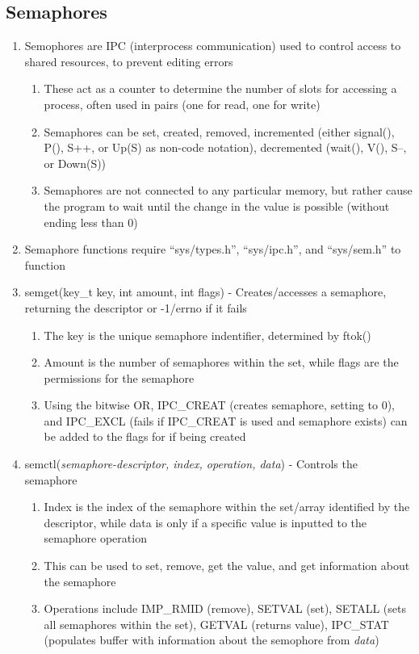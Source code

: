 \documentclass[11 pt, twoside]{article}
\begin{document}
\subsection{Semaphores}
\begin{enumerate}
\item Semophores are IPC (interprocess communication) used to control access to shared resources, to prevent editing errors
\begin{enumerate}
\item These act as a counter to determine the number of slots for accessing a process, often used in pairs (one for read, one for write)
\item Semaphores can be set, created, removed, incremented (either signal(), P(), S++, or Up(S) as non-code notation), decremented (wait(), V(), S--, or Down(S))
\item Semaphores are not connected to any particular memory, but rather cause the program to wait until the change in the value is possible (without ending less than 0)
\end{enumerate}
\item Semaphore functions require ``sys/types.h'', ``sys/ipc.h'', and ``sys/sem.h'' to function
\item semget(key\_t key, int amount, int flags) - Creates/accesses a semaphore, returning the descriptor or -1/errno if it fails
\begin{enumerate}
\item The key is the unique semaphore indentifier, determined by ftok()
\item Amount is the number of semaphores within the set, while flags are the permissions for the semaphore
\item Using the bitwise OR, IPC\_CREAT (creates semaphore, setting to 0), and IPC\_EXCL (fails if IPC\_CREAT is used and semaphore exists) can be added to the flags for if being created
\end{enumerate}
\item semctl(\textit{semaphore-descriptor, index, operation, data}) - Controls the semaphore
\begin{enumerate}
\item Index is the index of the semaphore within the set/array identified by the descriptor, while data is only if a specific value is inputted to the semaphore operation
\item This can be used to set, remove, get the value, and get information about the semaphore
\item Operations include IMP\_RMID (remove), SETVAL (set), SETALL (sets all semaphores within the set), GETVAL (returns value), IPC\_STAT (populates buffer with information about the semophore from \textit{data})

\end{enumerate}
\end{enumerate}
\end{document}
